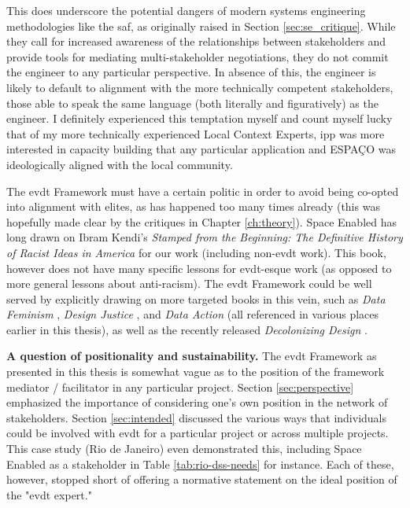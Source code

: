 This does underscore the potential dangers of modern systems engineering methodologies like the \ac{saf}, as originally raised in Section \ref{sec:se_critique}. While they call for increased awareness of the relationships between stakeholders and provide tools for mediating multi-stakeholder negotiations, they do not commit the engineer to any particular perspective. In absence of this, the engineer is likely to default to alignment with the more technically competent stakeholders, those able to speak the same language (both literally and figuratively) as the engineer. I definitely experienced this temptation myself and count myself lucky that of my more technically experienced Local Context Experts, \ac{ipp} was more interested in capacity building that any particular application and ESPAÇO was ideologically aligned with the local community.

The \ac{evdt} Framework must have a certain politic in order to avoid being co-opted into alignment with elites, as has happened too many times already (this was hopefully made clear by the critiques in Chapter \ref{ch:theory}). Space Enabled has long drawn on Ibram Kendi's \textit{Stamped from the Beginning: The Definitive History of Racist Ideas in America} \cite{kendiStampedBeginningDefinitive2017} for our work (including non-\ac{evdt} work). This book, however does not have many specific lessons for \ac{evdt}-esque work (as opposed to more general lessons about anti-racism). The \ac{evdt} Framework could be well served by explicitly drawing on more targeted books in this vein, such as \textit{Data Feminism} \cite{dignazioDataFeminism2020}, \textit{Design Justice} \cite{costanza-chockDesignJusticeCommunityLed2020}, and \textit{Data Action} \cite{williamsDataActionUsing2020} (all referenced in various places earlier in this thesis), as well as the recently released \textit{Decolonizing Design} \cite{tunstallDecolonizingDesignCultural2023}. 

\textbf{A question of positionality and sustainability.} The \ac{evdt} Framework as presented in this thesis is somewhat vague as to the position of the framework mediator / facilitator in any particular project. Section \ref{sec:perspective} emphasized the importance of considering one's own position in the network of stakeholders. Section \ref{sec:intended} discussed the various ways that individuals could be involved with \ac{evdt} for a particular project or across multiple projects. This case study (Rio de Janeiro) even demonstrated this, including Space Enabled as a stakeholder in Table \ref{tab:rio-dss-needs} for instance. Each of these, however, stopped short of offering a normative statement on the ideal position of the "\ac{evdt} expert."

